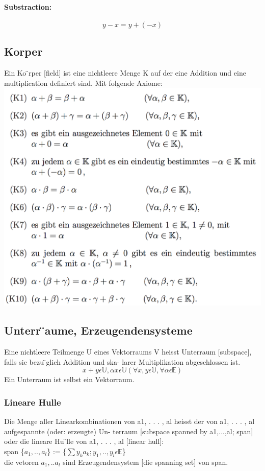 \documentclass[11pt]{article}
\newcommand\tab[1][1cm]{\hspace*{#1}}
\newcommand\back[1][-3cm]{\hspace*{#1}}
\begin{document}
\paragraph{Substraction:}
\begin{equation}
	y-x=y+(-x)
\end{equation}
\subsection{Korper}
Ein Ko ̈rper [field] ist eine nichtleere Menge K auf der eine Addition und eine multiplication definiert sind. Mit folgende Axiome:\\
\back\includegraphics{images/feld}
\subsection{Unterr ̈aume, Erzeugendensysteme}
Eine nichtleere Teilmenge U eines Vektorraums V heisst Unterraum [subspace], falls sie bezu ̈glich Addition und ska- larer Multiplikation abgeschlossen ist.
\begin{equation}
	x+y \epsilon \mathbb{U},\alpha x \epsilon \mathbb{U} (\forall x,y \epsilon \mathbb{U}, \forall \alpha \epsilon \mathbb{E})
\end{equation}
Ein Unterraum ist selbst ein Vektorraum.
\subsubsection{Lineare Hulle}
Die Menge aller Linearkombinationen von a1, . . . , al heisst der von a1, . . . , al aufgespannte (oder: erzeugte) Un- terraum [subspace spanned by a1,...,al; span] oder die lineare Hu ̈lle von a1, . . . , al [linear hull]:\\
\tab span \{$a_1,..,a_l$\} := \{$\sum y_ka_k; y_1,..,y_l \epsilon \mathbb{E}$\}\\
die vetoren $a_1,..a_l$ sind Erzeugendensystem [die spanning set] von span.
\end{document}
